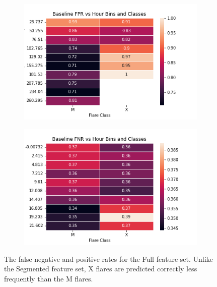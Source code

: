 \documentclass[defaultstyle,11pt]{thesis}
\begin{document}
\begin{figure}[h]
\centering
\begin{subfigure}[b]{.45\textwidth}
    \includegraphics[width=\linewidth]{ThesisFilePkg/figures/findings/baselineFPR.png}
\end{subfigure}
\begin{subfigure}[b]{.45\textwidth}
    \includegraphics[width=\linewidth]{ThesisFilePkg/figures/findings/baselineFNR.png}
\end{subfigure}
\label{fig:basfr}
\caption{The false negative and positive rates for the Full feature set. Unlike the Segmented feature set, X flares are predicted correctly less frequently than the M flares.}
\end{figure}
\end{document}
